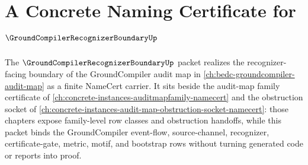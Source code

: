 \chapter{A Concrete Naming Certificate for $\GroundCompilerRecognizerBoundaryUp$}
\label{ch:concrete-instances-groundcompilerrecognizerboundary-namecert}

The $\GroundCompilerRecognizerBoundaryUp$ packet realizes the recognizer-facing boundary of the GroundCompiler audit map in \autoref{ch:bedc-groundcompiler-audit-map} as a finite NameCert carrier. It sits beside the audit-map family certificate of \autoref{ch:concrete-instances-auditmapfamily-namecert} and the obstruction socket of \autoref{ch:concrete-instances-audit-map-obstruction-socket-namecert}: those chapters expose family-level row classes and obstruction handoffs, while this packet binds the GroundCompiler event-flow, source-channel, recognizer, certificate-gate, metric, motif, and bootstrap rows without turning generated code or reports into proof.

